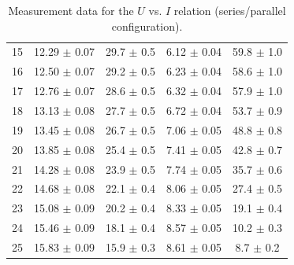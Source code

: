 \documentclass{article}
\begin{document}
{\begin{table}[H]
\begin{tabular}{ccc||cc}
        15 & 12.29   $\pm$ 0.07           & 29.7    $\pm$ 0.5            & 6.12   $\pm$ 0.04 & 59.8   $\pm$ 1.0 \\
        16 & 12.50   $\pm$ 0.07           & 29.2    $\pm$ 0.5            & 6.23   $\pm$ 0.04 & 58.6   $\pm$ 1.0 \\
        17 & 12.76   $\pm$ 0.07           & 28.6    $\pm$ 0.5            & 6.32   $\pm$ 0.04 & 57.9   $\pm$ 1.0 \\
        18 & 13.13   $\pm$ 0.08           & 27.7    $\pm$ 0.5            & 6.72   $\pm$ 0.04 & 53.7   $\pm$ 0.9 \\
        19 & 13.45   $\pm$ 0.08           & 26.7    $\pm$ 0.5            & 7.06   $\pm$ 0.05 & 48.8   $\pm$ 0.8 \\
        20 & 13.85   $\pm$ 0.08           & 25.4    $\pm$ 0.5            & 7.41   $\pm$ 0.05 & 42.8   $\pm$ 0.7 \\
        21 & 14.28   $\pm$ 0.08           & 23.9    $\pm$ 0.5            & 7.74   $\pm$ 0.05 & 35.7   $\pm$ 0.6 \\
        22 & 14.68   $\pm$ 0.08           & 22.1    $\pm$ 0.4            & 8.06   $\pm$ 0.05 & 27.4   $\pm$ 0.5 \\
        23 & 15.08   $\pm$ 0.09           & 20.2    $\pm$ 0.4            & 8.33   $\pm$ 0.05 & 19.1   $\pm$ 0.4 \\
        24 & 15.46   $\pm$ 0.09           & 18.1    $\pm$ 0.4            & 8.57   $\pm$ 0.05 & 10.2   $\pm$ 0.3 \\
        25 & 15.83   $\pm$ 0.09           & 15.9    $\pm$ 0.3            & 8.61   $\pm$ 0.05 & 8.7    $\pm$ 0.2 \\
        \bottomrule
    \end{tabular}
    \caption{Measurement data for the $U$ vs. $I$ relation (series/parallel configuration).}\label{TableUISP}
\end{table}

}
\end{document}
